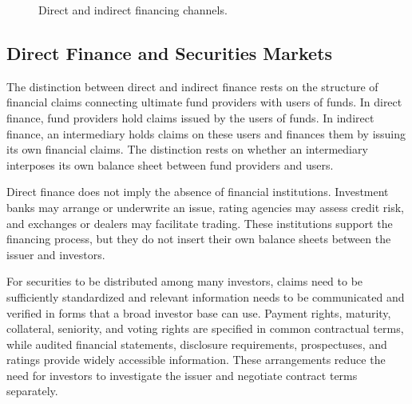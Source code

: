 \begin{figure}[htbp]

\caption{Direct and indirect financing channels.}
\label{fig:ch4-direct-indirect-finance}
\end{figure}

\subsection{Direct Finance and Securities Markets}

The distinction between direct and indirect finance rests on the structure of financial claims connecting ultimate fund providers with users of funds. In direct finance, fund providers hold claims issued by the users of funds. In indirect finance, an intermediary holds claims on these users and finances them by issuing its own financial claims. The distinction rests on whether an intermediary interposes its own balance sheet between fund providers and users.

Direct finance does not imply the absence of financial institutions. Investment banks may arrange or underwrite an issue, rating agencies may assess credit risk, and exchanges or dealers may facilitate trading. These institutions support the financing process, but they do not insert their own balance sheets between the issuer and investors.

For securities to be distributed among many investors, claims need to be sufficiently standardized and relevant information needs to be communicated and verified in forms that a broad investor base can use. Payment rights, maturity, collateral, seniority, and voting rights are specified in common contractual terms, while audited financial statements, disclosure requirements, prospectuses, and ratings provide widely accessible information. These arrangements reduce the need for investors to investigate the issuer and negotiate contract terms separately.


